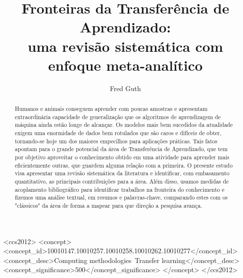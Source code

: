 \documentclass[sigconf]{acmart}
\begin{document}
%
\title[Fronteiras da Transferência de Aprendizado: uma revisão sistemática com enfoque meta-analítico]{Fronteiras da Transferência de Aprendizado: \\
uma revisão sistemática com enfoque meta-analítico}
%

\author{Fred Guth}

\renewcommand{\shortauthors}{Guth, F.}

\begin{abstract}
  Humanos e animais conseguem aprender com poucas amostras \cite{goodfellow} e apresentam extraordinária capacidade de generalização que os algoritmos de aprendizagem de máquina ainda estão longe de alcançar. Os modelos mais bem sucedidos da atualidade exigem uma enormidade de dados bem rotulados que são caros e difíceis de obter, tornando-se hoje um dos maiores empecilhos para aplicações práticas. Tais fatos apontam para o grande potencial da área de Transferência de Aprendizado, que tem por objetivo aproveitar o conhecimento obtido em uma atividade para aprender mais eficientemente outras, que guardem alguma relação com a primeira. O presente estudo visa apresentar uma revisão sistemática da literatura e identificar, com embasamento quantitativo, as principais contribuições para a área. Além disso, usamos medidas de acoplamento bibliográfico para identificar trabalhos na fronteira do conhecimento e fizemos uma análise textual, em resumos e palavras-chave, comparando estes com os "clássicos" da área de forma a mapear para que direção a pesquisa avança.  
\end{abstract}


\begin{CCSXML}
<ccs2012>
 <concept>
 <concept_id>10010147.10010257.10010258.10010262.10010277</concept_id>
 <concept_desc>Computing methodologies~Transfer learning</concept_desc>
 <concept_significance>500</concept_significance>
 </concept>
</ccs2012>
\end{CCSXML}



\maketitle
\end{document}
